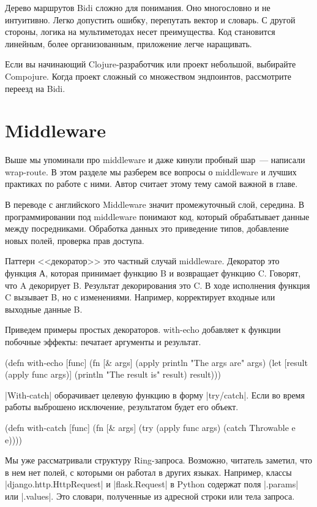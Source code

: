 Дерево маршрутов Bidi сложно для понимания. Оно многословно и не
интуитивно. Легко допустить ошибку, перепутать вектор и словарь. С другой
стороны, логика на мультиметодах несет преимущества. Код становится линейным,
более организованным, приложение легче наращивать.

Если вы начинающий Clojure-разработчик или проект небольшой, выбирайте
Compojure. Когда проект сложный со множеством эндпоинтов, рассмотрите переезд на
Bidi.

\section{Middleware}

Выше мы упоминали про middleware и даже кинули пробный шар~--- написали
wrap-route. В этом разделе мы разберем все вопросы о middleware и лучших
практиках по работе с ними. Автор считает этому тему самой важной в главе.

В переводе с английского Middleware значит промежуточный слой, середина. В
программировании под middleware понимают код, который обрабатывает данные между
посредниками. Обработка данных это приведение типов, добавление новых полей,
проверка прав доступа.

Паттерн <<декоратор>> это частный случай middleware. Декоратор это функция А,
которая принимает функцию B и возвращает функцию C. Говорят, что A декорирует
B. Результат декорирования это C. В ходе исполнения функция C вызывает B, но с
изменениями. Например, корректирует входные или выходные данные B.

Приведем примеры простых декораторов. with-echo добавляет к функции побочные
эффекты: печатает аргументы и результат.

\begin{code}
(defn with-echo
  [func]
  (fn [& args]
    (apply println "The args are" args)
    (let [result (apply func args)]
      (println "The result is" result)
      result)))
\end{code}

\spverb|With-catch| оборачивает целевую функцию в форму \spverb|try/catch|. Если во время
работы выброшено исключение, результатом будет его объект.

\begin{code}
(defn with-catch
  [func]
  (fn [& args]
    (try
      (apply func args)
      (catch Throwable e
        e))))
\end{code}

Мы уже рассматривали структуру Ring-запроса. Возможно, читатель заметил, что в
нем нет полей, с которыми он работал в других языках. Например, классы
\spverb|django.http.HttpRequest| и \spverb|flask.Request| в Python содержат поля \spverb|.params| или
\spverb|.values|. Это словари, полученные из адресной строки или тела запроса.

